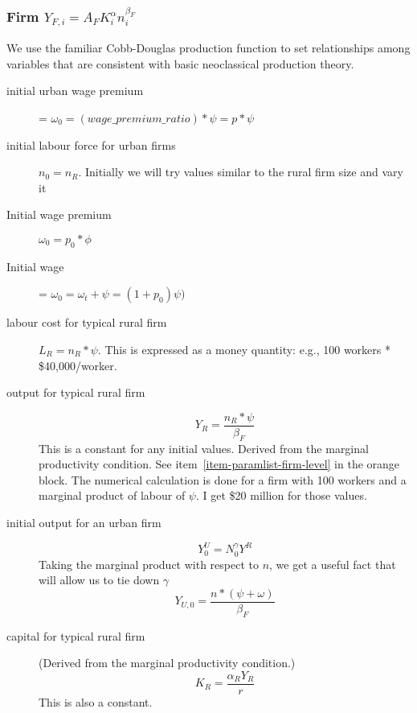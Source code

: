 \subsubsection{Firm $Y_{F,i}=A_FK_i^\alpha n_i^{\beta_F}$}
We use the familiar Cobb-Douglas production function \cite{chiangFundamentalMethodsMathematical2002} to set relationships among variables that are consistent with basic neoclassical production theory. 
\begin{description}

\item[initial urban wage premium] = $\omega_0 = (wage\_premium\_ratio) * \psi = p*\psi $

\item[initial labour force for urban firms] $n_0=n_R$.  Initially we will try values similar to the rural firm size and vary it  %

\item[Initial wage premium] $\omega_0=p_0*\phi$

\item[Initial wage] = $\omega_0=\omega_t +\psi =(1+p_0)\psi)$

\item[labour cost for typical rural firm] $L_R = n_R*\psi$. This is expressed as a money quantity: e.g., 100 workers * \$40,000/worker.  


\item[output for typical rural firm]  
\[Y_R=\frac{n_R*\psi}{\beta_F}\]
This is a constant for any initial values. Derived from the marginal productivity condition. See item~\ref{item-paramlist-firm-level} in the orange  block. The numerical calculation is done  for a firm with 100 workers and a marginal product of labour of $\psi$. I get \$20 million for those values. 


\item[initial output for an urban firm] 
\[Y_0^U=N_0^\gamma Y^R\]  
Taking the marginal product with respect to $n$, we get a useful fact that will allow us to tie down $\gamma$
\[Y_{U,0}=\frac{n*(\psi+\omega)}{\beta_F}\]

\item[capital for typical rural firm] (Derived from the marginal productivity condition.)
\[K_R=  \frac{\alpha_R Y_R }{r}\]
This is also a constant.
 

\end{description}
